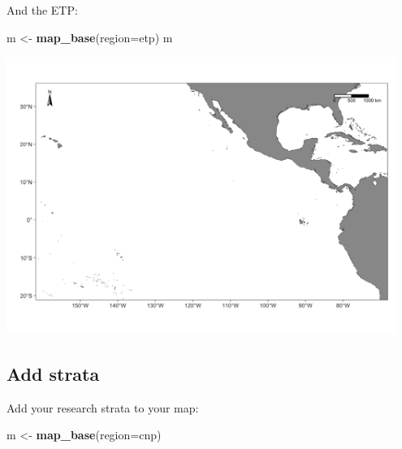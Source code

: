 \documentclass[
]{book}
\newenvironment{Shaded}{\begin{snugshade}}{\end{snugshade}}
\newcommand{\AttributeTok}[1]{\textcolor[rgb]{0.13,0.29,0.53}{#1}}
\newcommand{\FunctionTok}[1]{\textcolor[rgb]{0.13,0.29,0.53}{\textbf{#1}}}
\newcommand{\NormalTok}[1]{#1}
\newcommand{\OtherTok}[1]{\textcolor[rgb]{0.56,0.35,0.01}{#1}}
\newcommand{\SpecialCharTok}[1]{\textcolor[rgb]{0.81,0.36,0.00}{\textbf{#1}}}
\newcommand{\StringTok}[1]{\textcolor[rgb]{0.31,0.60,0.02}{#1}}
\begin{document}
And the ETP:

\begin{Shaded}
\begin{Highlighting}[]
\NormalTok{m }\OtherTok{\textless{}{-}} \FunctionTok{map\_base}\NormalTok{(}\AttributeTok{region=}\StringTok{\textquotesingle{}etp\textquotesingle{}}\NormalTok{)}
\NormalTok{m}
\end{Highlighting}
\end{Shaded}

\includegraphics[width=0.95\textwidth,height=\textheight]{img/map_etp.png}

\hypertarget{add-strata}{%
\subsection*{Add strata}\label{add-strata}}

Add your research strata to your map:

\begin{Shaded}
\begin{Highlighting}[]
\NormalTok{m }\OtherTok{\textless{}{-}} \FunctionTok{map\_base}\NormalTok{(}\AttributeTok{region=}\StringTok{\textquotesingle{}cnp\textquotesingle{}}\NormalTok{)}
\end{Highlighting}
\end{Shaded}

\begin{Shaded}
\end{Shaded}
\end{document}
